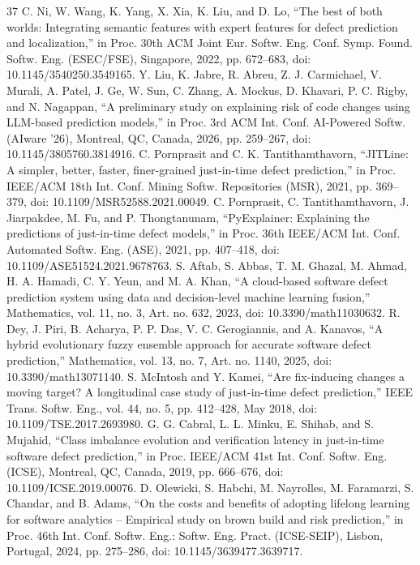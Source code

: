 \begin{thebibliography}{37}
 C. Ni, W. Wang, K. Yang, X. Xia, K. Liu, and D. Lo, ``The best of both worlds: Integrating semantic features with expert features for defect prediction and localization,'' in Proc. 30th ACM Joint Eur. Softw. Eng. Conf. Symp. Found. Softw. Eng. (ESEC/FSE), Singapore, 2022, pp. 672--683, doi: \mbox{10.1145/3540250.3549165}.
 Y. Liu, K. Jabre, R. Abreu, Z. J. Carmichael, V. Murali, A. Patel, J. Ge, W. Sun, C. Zhang, A. Mockus, D. Khavari, P. C. Rigby, and N. Nagappan, ``A preliminary study on explaining risk of code changes using LLM-based prediction models,'' in Proc. 3rd ACM Int. Conf. AI-Powered Softw. (AIware '26), Montreal, QC, Canada, 2026, pp. 259--267, doi: \mbox{10.1145/3805760.3814916}.
 C. Pornprasit and C. K. Tantithamthavorn, ``JITLine: A simpler, better, faster, finer-grained just-in-time defect prediction,'' in Proc. IEEE/ACM 18th Int. Conf. Mining Softw. Repositories (MSR), 2021, pp. 369--379, doi: \mbox{10.1109/MSR52588.2021.00049}.
 C. Pornprasit, C. Tantithamthavorn, J. Jiarpakdee, M. Fu, and P. Thongtanunam, ``PyExplainer: Explaining the predictions of just-in-time defect models,'' in Proc. 36th IEEE/ACM Int. Conf. Automated Softw. Eng. (ASE), 2021, pp. 407--418, doi: \mbox{10.1109/ASE51524.2021.9678763}.
 S. Aftab, S. Abbas, T. M. Ghazal, M. Ahmad, H. A. Hamadi, C. Y. Yeun, and M. A. Khan, ``A cloud-based software defect prediction system using data and decision-level machine learning fusion,'' Mathematics, vol. 11, no. 3, Art. no. 632, 2023, doi: \mbox{10.3390/math11030632}.
 R. Dey, J. Piri, B. Acharya, P. P. Das, V. C. Gerogiannis, and A. Kanavos, ``A hybrid evolutionary fuzzy ensemble approach for accurate software defect prediction,'' Mathematics, vol. 13, no. 7, Art. no. 1140, 2025, doi: \mbox{10.3390/math13071140}.
 S. McIntosh and Y. Kamei, ``Are fix-inducing changes a moving target? A longitudinal case study of just-in-time defect prediction,'' IEEE Trans. Softw. Eng., vol. 44, no. 5, pp. 412--428, May 2018, doi: \mbox{10.1109/TSE.2017.2693980}.
 G. G. Cabral, L. L. Minku, E. Shihab, and S. Mujahid, ``Class imbalance evolution and verification latency in just-in-time software defect prediction,'' in Proc. IEEE/ACM 41st Int. Conf. Softw. Eng. (ICSE), Montreal, QC, Canada, 2019, pp. 666--676, doi: \mbox{10.1109/ICSE.2019.00076}.
 D. Olewicki, S. Habchi, M. Nayrolles, M. Faramarzi, S. Chandar, and B. Adams, ``On the costs and benefits of adopting lifelong learning for software analytics -- Empirical study on brown build and risk prediction,'' in Proc. 46th Int. Conf. Softw. Eng.: Softw. Eng. Pract. (ICSE-SEIP), Lisbon, Portugal, 2024, pp. 275--286, doi: \mbox{10.1145/3639477.3639717}.

\end{thebibliography}
